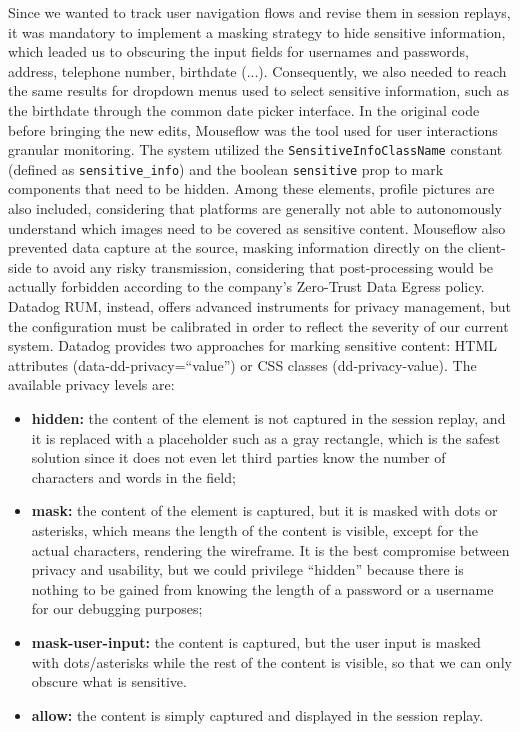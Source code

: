 \documentclass[12pt,a4paper,openright,twoside]{book}
\begin{document}
Since we wanted to track user navigation flows and revise them in session replays, it was mandatory to implement a masking strategy to hide sensitive information, which leaded us to obscuring the input fields for usernames and passwords, address, telephone number, birthdate (...). Consequently, we also needed to reach the same results for dropdown menus used to select sensitive information, such as the birthdate through the common date picker interface. In the original code before bringing the new edits, Mouseflow was the tool used for user interactions granular monitoring. The system utilized the \texttt{SensitiveInfoClassName} constant (defined as \texttt{sensitive\_info}) and the boolean \texttt{sensitive} prop to mark components that need to be hidden. Among these elements, profile pictures are also included, considering that platforms are generally not able to autonomously understand which images need to be covered as sensitive content. Mouseflow also prevented data capture at the source, masking information directly on the client-side to avoid any risky transmission, considering that post-processing would be actually forbidden according to the company's Zero-Trust Data Egress policy. 
Datadog RUM, instead, offers advanced instruments for privacy management, but the configuration must be calibrated in order to reflect the severity of our current system. Datadog provides two approaches for marking sensitive content: HTML attributes (data-dd-privacy=``value'') or CSS classes (dd-privacy-value). The available privacy levels are:
\begin{itemize}
    \item \textbf{hidden:} the content of the element is not captured in the session replay, and it is replaced with a placeholder such as a gray rectangle, which is the safest solution since it does not even let third parties know the number of characters and words in the field;
    \item \textbf{mask:} the content of the element is captured, but it is masked with dots or asterisks, which means the length of the content is visible, except for the actual characters, rendering the wireframe. It is the best compromise between privacy and usability, but we could privilege ``hidden'' because there is nothing to be gained from knowing the length of a password or a username for our debugging purposes;
    \item \textbf{mask-user-input:} the content is captured, but the user input is masked with dots/asterisks while the rest of the content is visible, so that we can only obscure what is sensitive. 
    \item \textbf{allow:} the content is simply captured and displayed in the session replay.
\end{itemize}
\end{document}
